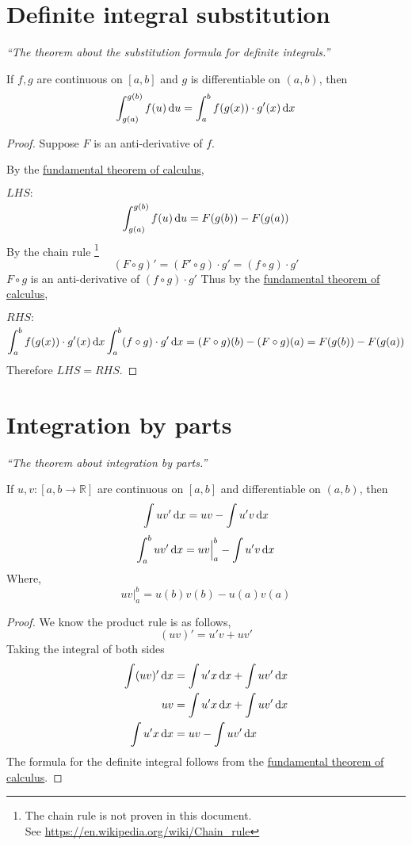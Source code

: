 \documentclass[12pt]{report}
\begin{document}
    \section{Definite integral substitution}
    \textit{``The theorem about the substitution formula for definite integrals.''} \vspace{3mm}
    \begin{theorem}
        If \(f,g\) are continuous on \([a,b]\) and \(g\) is differentiable on \((a,b)\), then
        \[\int^{g(b)}_{g(a)}f(u) \, \mathrm{d} u = \int^b_a f(g(x))\cdot g'(x) \, \mathrm{d} x\]
    \end{theorem}
    \begin{proof}
        Suppose \(F\) is an anti-derivative of \(f\).

        By the \hyperref[Fundamental theorem of calculus]{fundamental theorem of calculus},

        \(LHS:\)
        \[\int^{g(b)}_{g(a)}f(u) \, \mathrm{d} u = F(g(b)) - F(g(a))\]
        By the chain rule \footnote{The chain rule is not proven in this document. \\ See \url{https://en.wikipedia.org/wiki/Chain_rule}}
        \[(F \circ g)' = (F' \circ g) \cdot g' = (f \circ g) \cdot g'\]
        \(F \circ g\) is an anti-derivative of \( (f \circ g) \cdot g'\)
        Thus by the \hyperref[Fundamental theorem of calculus]{fundamental theorem of calculus},

        \(RHS:\)
        \[\int^b_a f(g(x))\cdot g'(x) \, \mathrm{d} x \int^b_a (f \circ g) \cdot g' \, \mathrm{d} x = (F \circ g)(b) - (F \circ g)(a) = F(g(b)) - F(g(a))\]
        Therefore \(LHS = RHS\).
    \end{proof}
    \section{Integration by parts}
    \textit{``The theorem about integration by parts.''} \vspace{3mm}
    \begin{theorem}
        If \(u,v: [a,b \to \mathbb{R}]\) are continuous on \([a,b]\) and differentiable on \((a,b)\), then
        \[\int uv' \, \mathrm{d} x = uv - \int u'v \, \mathrm{d} x\]
        \[\int^b_a uv' \, \mathrm{d} x = uv \Big|^b_a - \int u'v \, \mathrm{d} x\]
        Where,
        \[uv \Big|^b_a = u(b)v(b) - u(a)v(a)\]
    \end{theorem}
    \begin{proof}
        We know the product rule is as follows,
        \[(uv)' = u'v + uv'\]
        Taking the integral of both sides
        \begin{align*}
            \int (uv)' \, \mathrm{d} x &= \int u'x \, \mathrm{d} x + \int uv' \, \mathrm{d} x\\
            uv &= \int u'x \, \mathrm{d} x + \int uv' \, \mathrm{d} x\\
            \int u'x \, \mathrm{d} x &= uv - \int uv' \, \mathrm{d} x
        \end{align*}
        The formula for the definite integral follows from the \hyperref[Fundamental theorem of calculus]{fundamental theorem of calculus}.
    \end{proof}
    \setcounter{section}{20}
\end{document}
